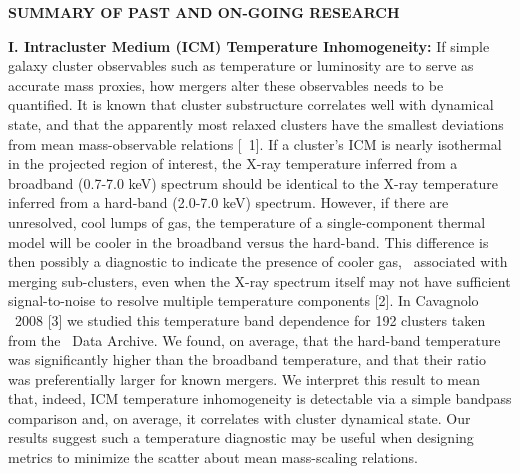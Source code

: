 \documentclass[letterpaper,11pt]{article}
\begin{document}
\begin{center}
  {\bf\uppercase{Summary of Past and On-going Research}}
\end{center}

{\bf{I. Intracluster Medium (ICM) Temperature Inhomogeneity:}} If
simple galaxy cluster observables such as temperature or luminosity
are to serve as accurate mass proxies, how mergers alter these
observables needs to be quantified. It is known that cluster
substructure correlates well with dynamical state, and that the
apparently most relaxed clusters have the smallest deviations from
mean mass-observable relations [\eg\ 1]. If a cluster's ICM is nearly
isothermal in the projected region of interest, the X-ray temperature
inferred from a broadband (0.7-7.0 keV) spectrum should be identical
to the X-ray temperature inferred from a hard-band (2.0-7.0 keV)
spectrum. However, if there are unresolved, cool lumps of gas, the
temperature of a single-component thermal model will be cooler in the
broadband versus the hard-band. This difference is then possibly a
diagnostic to indicate the presence of cooler gas, \eg\ associated
with merging sub-clusters, even when the X-ray spectrum itself may not
have sufficient signal-to-noise to resolve multiple temperature
components [2]. In Cavagnolo \etal\ 2008 [3] we studied this
temperature band dependence for 192 clusters taken from the
\chandra\ Data Archive. We found, on average, that the hard-band
temperature was significantly higher than the broadband temperature,
and that their ratio was preferentially larger for known mergers. We
interpret this result to mean that, indeed, ICM temperature
inhomogeneity is detectable via a simple bandpass comparison and, on
average, it correlates with cluster dynamical state. Our results
suggest such a temperature diagnostic may be useful when designing
metrics to minimize the scatter about mean mass-scaling relations.
\end{document}
